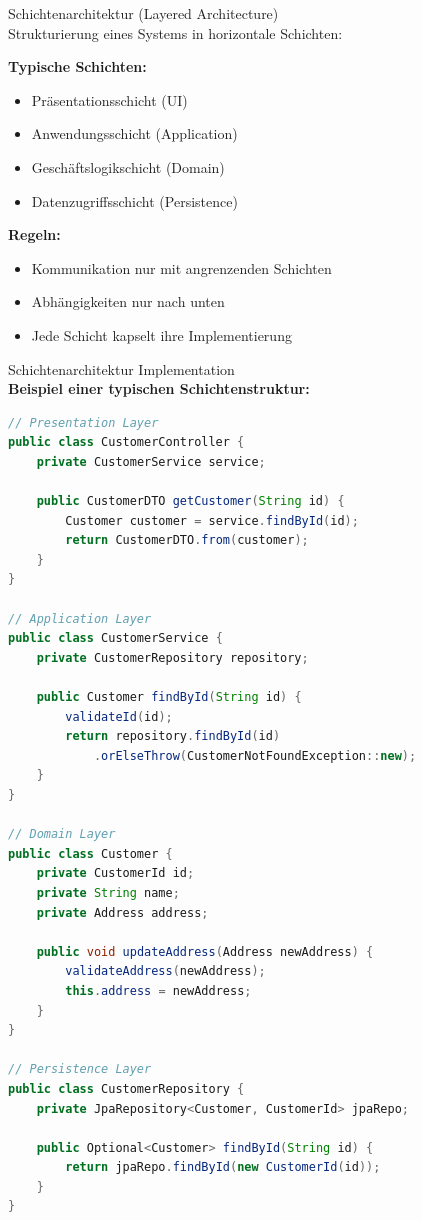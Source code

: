 \begin{concept}{Schichtenarchitektur (Layered Architecture)}\\
Strukturierung eines Systems in horizontale Schichten:

\textbf{Typische Schichten:}
\begin{itemize}
    \item Präsentationsschicht (UI)
    \item Anwendungsschicht (Application)
    \item Geschäftslogikschicht (Domain)
    \item Datenzugriffsschicht (Persistence)
\end{itemize}

\textbf{Regeln:}
\begin{itemize}
    \item Kommunikation nur mit angrenzenden Schichten
    \item Abhängigkeiten nur nach unten
    \item Jede Schicht kapselt ihre Implementierung
\end{itemize}
\end{concept}

\begin{example2}{Schichtenarchitektur Implementation}\\
\textbf{Beispiel einer typischen Schichtenstruktur:}

\begin{lstlisting}[language=Java, style=basesmol]
// Presentation Layer
public class CustomerController {
    private CustomerService service;
    
    public CustomerDTO getCustomer(String id) {
        Customer customer = service.findById(id);
        return CustomerDTO.from(customer);
    }
}

// Application Layer
public class CustomerService {
    private CustomerRepository repository;
    
    public Customer findById(String id) {
        validateId(id);
        return repository.findById(id)
            .orElseThrow(CustomerNotFoundException::new);
    }
}

// Domain Layer
public class Customer {
    private CustomerId id;
    private String name;
    private Address address;
    
    public void updateAddress(Address newAddress) {
        validateAddress(newAddress);
        this.address = newAddress;
    }
}

// Persistence Layer
public class CustomerRepository {
    private JpaRepository<Customer, CustomerId> jpaRepo;
    
    public Optional<Customer> findById(String id) {
        return jpaRepo.findById(new CustomerId(id));
    }
}
\end{lstlisting}
\end{example2}

